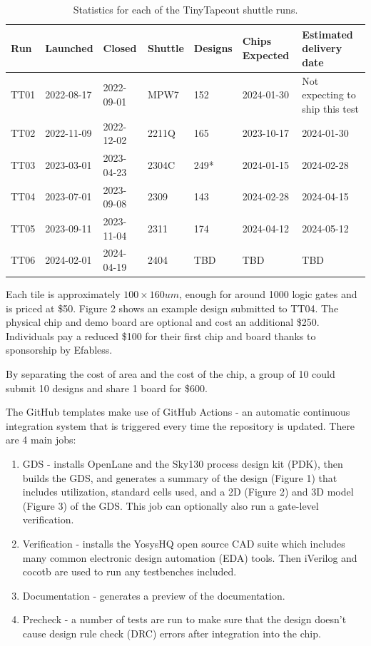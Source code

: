 \begin{table}[htbp]
\centering
\caption{Statistics for each of the TinyTapeout shuttle runs.}
\label{tab:tinytapeout}
\begin{tabularx}{\textwidth}{@{}l *{6}{X}@{}}
\toprule
\textbf{Run} & \textbf{Launched} & \textbf{Closed} & \textbf{Shuttle} & \textbf{Designs} & \textbf{Chips Expected} & \textbf{Estimated delivery date} \\
\midrule
TT01 & 2022-08-17 & 2022-09-01 & MPW7  & 152 & 2024-01-30 & Not expecting to ship this test \\
TT02 & 2022-11-09 & 2022-12-02 & 2211Q & 165 & 2023-10-17 & 2024-01-30 \\
TT03 & 2023-03-01 & 2023-04-23 & 2304C & 249* & 2024-01-15 & 2024-02-28 \\
TT04 & 2023-07-01 & 2023-09-08 & 2309  & 143 & 2024-02-28 & 2024-04-15 \\
TT05 & 2023-09-11 & 2023-11-04 & 2311  & 174 & 2024-04-12 & 2024-05-12 \\
TT06 & 2024-02-01 & 2024-04-19 & 2404  & TBD & TBD        & TBD \\
\bottomrule
\end{tabularx}
\end{table}

Each tile is approximately $100\times 160 um$, enough for around 1000 logic gates and is priced at \$50. Figure 2 shows an example design submitted to TT04.
The physical chip and demo board are optional and cost an additional \$250.
Individuals pay a reduced \$100 for their first chip and board thanks to sponsorship by Efabless\cite{efabless}.

By separating the cost of area and the cost of the chip, a group of 10 could submit 10 designs and share 1 board for \$600.

The GitHub templates\cite{verilogtemplate} make use of GitHub Actions\cite{githubactions} - an automatic continuous integration system that is triggered every time the repository is updated.
There are 4 main jobs:

\begin{enumerate}
	\item GDS - installs OpenLane and the Sky130 process design kit (PDK), then builds the GDS, and generates a summary of the design (Figure 1) that includes utilization, standard cells used, and a 2D (Figure 2) and 3D model (Figure 3) of the GDS.
This job can optionally also run a gate-level verification.
	\item Verification - installs the YosysHQ open source CAD suite which includes many common electronic design automation (EDA) tools.
Then iVerilog\cite{iverilog} and cocotb\cite{cocotb} are used to run any testbenches included.
	\item Documentation - generates a preview of the documentation.
	\item Precheck - a number of tests are run to make sure that the design doesn’t cause design rule check (DRC) errors after integration into the chip.
\end{enumerate}


